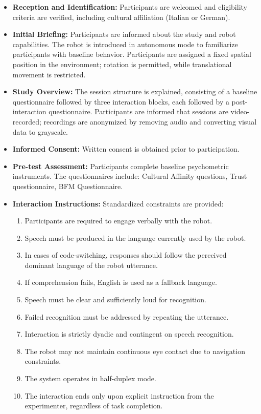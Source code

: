 \begin{itemize}
\item \textbf{Reception and Identification:} Participants are welcomed and eligibility criteria are verified, including cultural affiliation (Italian or German).

\item \textbf{Initial Briefing:} Participants are informed about the study and robot capabilities. The robot is introduced in autonomous mode to familiarize participants with baseline behavior. Participants are assigned a fixed spatial position in the environment; rotation is permitted, while translational movement is restricted.

\item \textbf{Study Overview:} The session structure is explained, consisting of a baseline questionnaire followed by three interaction blocks, each followed by a post-interaction questionnaire. Participants are informed that sessions are video-recorded; recordings are anonymized by removing audio and converting visual data to grayscale.

\item \textbf{Informed Consent:} Written consent is obtained prior to participation.

\item \textbf{Pre-test Assessment:} Participants complete baseline psychometric instruments. The questionnaires include: Cultural Affinity questions, Trust questionnaire, BFM Questionnaire. 

\item \textbf{Interaction Instructions:} Standardized constraints are provided:
\begin{enumerate}
    \item Participants are required to engage verbally with the robot.
    \item Speech must be produced in the language currently used by the robot.
    \item In cases of code-switching, responses should follow the perceived dominant language of the robot utterance.
    \item If comprehension fails, English is used as a fallback language.
    \item Speech must be clear and sufficiently loud for recognition.
    \item Failed recognition must be addressed by repeating the utterance.
    \item Interaction is strictly dyadic and contingent on speech recognition.
    \item The robot may not maintain continuous eye contact due to navigation constraints.
    \item The system operates in half-duplex mode.
    \item The interaction ends only upon explicit instruction from the experimenter, regardless of task completion.
\end{enumerate}


\end{itemize}
